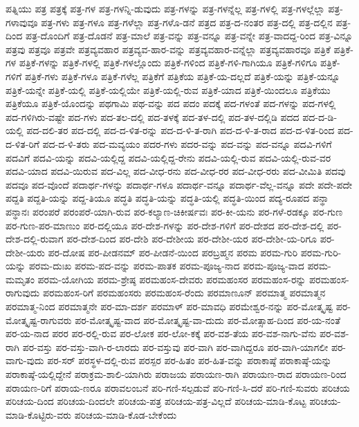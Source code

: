 {ಪತ್ನಿಯು
ಪತ್ರ
ಪತ್ರಕ್ಕೆ
ಪತ್ರ-ಗಳ
ಪತ್ರ-ಗಳನ್ನಿ-ಡುವುದು
ಪತ್ರ-ಗಳನ್ನು
ಪತ್ರ-ಗಳನ್ನೆಲ್ಲ
ಪತ್ರ-ಗಳಲ್ಲಿ
ಪತ್ರ-ಗಳಲ್ಲೆಲ್ಲಾ
ಪತ್ರ-ಗಳಾವುವೂ
ಪತ್ರ-ಗಳು
ಪತ್ರ-ಗಳೂ
ಪತ್ರ-ಗಳೆಲ್ಲಾ
ಪತ್ರ-ಗಳೊ-ಡನೆ
ಪತ್ರದ
ಪತ್ರ-ದ-ನಂತರ
ಪತ್ರ-ದಲ್ಲಿ
ಪತ್ರ-ದಲ್ಲಿನ
ಪತ್ರ-ದಿಂದ
ಪತ್ರ-ದೊಂದಿಗೆ
ಪತ್ರ-ದೊಡನೆ
ಪತ್ರ-ಮಾಲೆ
ಪತ್ರ-ವನ್ನು
ಪತ್ರ-ವನ್ನೂ
ಪತ್ರ-ವನ್ನೇ
ಪತ್ರ-ವಾದದ್ದ-ರಿಂದ
ಪತ್ರ-ವಿನ್ನೂ
ಪತ್ರವು
ಪತ್ರವೂ
ಪತ್ರವೇ
ಪತ್ರವ್ಯವಹಾರ
ಪತ್ರವ್ಯವ-ಹಾರ-ವನ್ನು
ಪತ್ರವ್ಯವಹಾರ-ವನ್ನೆಲ್ಲಾ
ಪತ್ರವ್ಯವಹಾರವೂ
ಪತ್ರಿಕೆ
ಪತ್ರಿಕೆ-ಗಳ
ಪತ್ರಿಕೆ-ಗಳನ್ನು
ಪತ್ರಿಕೆ-ಗಳಲ್ಲಿ
ಪತ್ರಿಕೆ-ಗಳಲ್ಲೊಂದು
ಪತ್ರಿಕೆ-ಗಳಿಂದ
ಪತ್ರಿಕೆ-ಗಳಿ-ಗಾಗಿಯೂ
ಪತ್ರಿಕೆ-ಗಳಿಗೂ
ಪತ್ರಿಕೆ-ಗಳಿಗೆ
ಪತ್ರಿಕೆ-ಗಳು
ಪತ್ರಿಕೆ-ಗಳೂ
ಪತ್ರಿಕೆ-ಗಳೆಲ್ಲ
ಪತ್ರಿಕೆಗೆ
ಪತ್ರಿಕೆಯ
ಪತ್ರಿಕೆ-ಯ-ದಲ್ಲದೆ
ಪತ್ರಿಕೆ-ಯನ್ನು
ಪತ್ರಿಕೆ-ಯನ್ನೂ
ಪತ್ರಿಕೆ-ಯನ್ನೇ
ಪತ್ರಿಕೆ-ಯಲ್ಲಿ
ಪತ್ರಿಕೆ-ಯಲ್ಲಿಯೇ
ಪತ್ರಿಕೆ-ಯಲ್ಲಿ-ರುವ
ಪತ್ರಿಕೆ-ಯಾದ
ಪತ್ರಿಕೆ-ಯಿಂದಲೂ
ಪತ್ರಿಕೆಯು
ಪತ್ರಿಕೆಯೂ
ಪತ್ರಿಕೆ-ಯೊಂದನ್ನು
ಪಥಗಾಮಿ
ಪಥ-ವನ್ನು
ಪದ
ಪದಂ
ಪದಕ್ಕೆ
ಪದ-ಗಳಂತೆ
ಪದ-ಗಳನ್ನು
ಪದ-ಗಳಲ್ಲಿ
ಪದ-ಗಳಿಗಿರು-ವಷ್ಟೇ
ಪದ-ಗಳು
ಪದ-ತಲ-ದಲ್ಲಿ
ಪದ-ತಳಕ್ಕೆ
ಪದ-ತಳ-ದಲ್ಲಿ
ಪದ-ತಳ-ದಲ್ಲಿಡಿ
ಪದದ
ಪದ-ದ-ಡಿ-ಯಲ್ಲಿ
ಪದ-ದಲಿ-ತರ
ಪದ-ದಲ್ಲಿ
ಪದ-ದ-ಳಿತ-ರನ್ನು
ಪದ-ದ-ಳಿ-ತ-ರಾಗಿ
ಪದ-ದ-ಳಿ-ತ-ರಾದ
ಪದ-ದ-ಳಿತ-ರಿಂದ
ಪದ-ದ-ಳಿತ-ರಿಗೆ
ಪದ-ದ-ಳಿ-ತರು
ಪದ-ಮವ್ಯಯಂ
ಪದರ-ಗಳು
ಪದರ-ವನ್ನು
ಪದ-ವನ್ನು
ಪದ-ವನ್ನೂ
ಪದವಿ-ಗಳಿಗೆ
ಪದವಿಗೆ
ಪದವಿ-ಯನ್ನು
ಪದವಿ-ಯಲ್ಲಿದ್ದ
ಪದವಿ-ಯಲ್ಲಿದ್ದ-ರೇನು
ಪದವಿ-ಯಲ್ಲಿ-ರುವ
ಪದವಿ-ಯಲ್ಲಿ-ರುವ-ವರ
ಪದವಿ-ಯಾದ
ಪದವಿ-ಯಿರುವ
ಪದ-ವಿಲ್ಲ
ಪದ-ವೀಧ-ರನು
ಪದ-ವೀಧ-ರರ
ಪದ-ವೀಧ-ರರು
ಪದ-ವೀಮಿತಿ
ಪದವು
ಪದವೂ
ಪದ-ವೊಂದೆ
ಪದಾರ್ಥ-ಗಳನ್ನು
ಪದಾರ್ಥ-ಗಳೂ
ಪದಾರ್ಥ-ವನ್ನೂ
ಪದಾರ್ಥ-ವೆಲ್ಲ-ವನ್ನೂ
ಪದೇ
ಪದೇ-ಪದೇ
ಪದ್ದತಿ
ಪದ್ದತಿ-ಯನ್ನು
ಪದ್ದ-ತಿಯೂ
ಪದ್ಧತಿ
ಪದ್ಧತಿ-ಯನ್ನು
ಪದ್ಧತಿ-ಯಲ್ಲಿ
ಪದ್ಧತಿ-ಯಿಂದ
ಪದ್ಯ-ರೂಪದ
ಪನ್ಥಾ
ಪನ್ಥಾನಃ
ಪರಂಪರೆ
ಪರಂಪರೆ-ಯಾಗಿ-ರುವ
ಪರ-ಕಲ್ಯಾಣ-ಚಿಕೀರ್ಷವಃ
ಪರ-ಕೀ-ಯನು
ಪರ-ಗಳೆ-ರಡಕ್ಕೂ
ಪರ-ಗುಣ
ಪರ-ಗುಣ-ಪರ-ಮಾಣುಂ
ಪರ-ದಲ್ಲಿಯೂ
ಪರ-ದೇಶ-ಗಳನ್ನು
ಪರ-ದೇಶ-ಗಳಿಗೆ
ಪರ-ದೇಶದ
ಪರ-ದೇಶ-ದಲ್ಲಿ
ಪರ-ದೇಶ-ದಲ್ಲಿ-ರುವಾಗ
ಪರ-ದೇಶ-ದಿಂದ
ಪರ-ದೇಶಿ
ಪರ-ದೇಶೀಯ
ಪರ-ದೇಶೀ-ಯರ
ಪರ-ದೇಶೀ-ಯ-ರಿಗೂ
ಪರ-ದೇಶೀ-ಯರು
ಪರ-ದೋಷ
ಪರ-ಪೀಡನಮ್
ಪರ-ಪೀಡನೆ-ಯಿಂದ
ಪರಬ್ರಹ್ಮನ
ಪರಮ
ಪರಮ-ಗುರಿ
ಪರಮ-ಗುರಿ-ಯನ್ನು
ಪರಮ-ದುಃಖ
ಪರಮ-ಪದ-ವನ್ನು
ಪರಮ-ಪಾತಕ
ಪರಮ-ಪೂಜ್ಯ-ನಾದ
ಪರಮ-ಪೂಜ್ಯ-ವಾದ
ಪರಮ-ಮಮೃತಂ
ಪರಮ-ಯೋಗಿಯ
ಪರಮ-ಶ್ರೇಷ್ಠ
ಪರಮಹಂಸ-ದೇವರು
ಪರಮಹಂಸರ
ಪರಮಹಂಸ-ರನ್ನು
ಪರಮಹಂಸ-ರಾಗುವುದು
ಪರಮಹಂಸ-ರಿಗೆ
ಪರಮಹಂಸರು
ಪರಮಹಂಸ-ರೆಂದು
ಪರಮಾಣೂನ್
ಪರಮಾತ್ಮ
ಪರಮಾತ್ಮನ
ಪರಮಾತ್ಮ-ನಿಂದ
ಪರಮಾತ್ಮನೇ
ಪರ-ಮಾ-ದರ್ಶ
ಪರಮಾಳ್
ಪರ-ಮಾವಧಿ
ಪರಮೇಶ್ವರ-ನನ್ನು
ಪರ-ಮೋತ್ಕೃಷ್ಟ
ಪರ-ಮೋತ್ಕೃಷ್ಟ-ರಾಗುವರು
ಪರ-ಮೋತ್ಕೃಷ್ಟ-ವಾದ
ಪರ-ಮೋತ್ಕೃಷ್ಟ-ವಾ-ದುದು
ಪರ-ಮೋತ್ಸಾಹ-ದಿಂದ
ಪರ-ಯ-ನಂತೆ
ಪರ-ಯ-ನಾದ
ಪರರ
ಪರ-ರಲ್ಲಿ-ರುವ
ಪರ-ಲೋಕ
ಪರ-ಲೋ-ಕಕ್ಕೆ
ಪರ-ವಶ-ತೆಯ
ಪರ-ವಶ-ನಾಗು-ವೆನು
ಪರ-ವಶ-ರಾಗಿ
ಪರ-ವಸ್ತು
ಪರ-ವಸ್ತು-ವಾಗಿ-ರ-ಲಾರದು
ಪರ-ವಸ್ತುವು
ಪರ-ವಾಗಿ
ಪರ-ವಾಗಿದ್ದರೂ
ಪರ-ವಾಗಿ-ಯಾಗಲೀ
ಪರ-ವಾಗು-ವುದು
ಪರ-ಸರ್
ಪರಸ್ಥಳ-ದಲ್ಲಿ-ರುವ
ಪರಸ್ಪರ
ಪರ-ಹಿತಂ
ಪರ-ಹಿತ-ವನ್ನು
ಪರಾಕಾಷ್ಠೆ
ಪರಾಕಾಷ್ಠೆ-ಯನ್ನು
ಪರಾಕಾಷ್ಠೆ-ಯಲ್ಲಿದ್ದೇನೆ
ಪರಾಕ್ರಮ-ಶಾಲಿ-ಯಾಗಿರು
ಪರಾಜಯ
ಪರಾಯಣ-ರಾಗಿ
ಪರಾಯಣ-ರಾದ
ಪರಾಯಣ-ರಿಂದ
ಪರಾಯಣ-ರಿಗೆ
ಪರಾಯ-ಣರೂ
ಪರಾವಲಂಬನೆ
ಪರಿ-ಗಣಿ-ಸಲ್ಪಡುವೆ
ಪರಿ-ಗಣಿ-ಸಿ-ದರೆ
ಪರಿ-ಗಣಿ-ಸುವರು
ಪರಿಚಯ
ಪರಿಚಯ-ದಿಂದ
ಪರಿಚಯ-ದಿಂದಲೇ
ಪರಿಚಯ-ಪತ್ರ
ಪರಿಚಯ-ಪತ್ರ-ವಿಲ್ಲದೆ
ಪರಿಚಯ-ಮಾಡಿ-ಕೊಟ್ಟ
ಪರಿಚಯ-ಮಾಡಿ-ಕೊಟ್ಟಿರು-ವರು
ಪರಿಚಯ-ಮಾಡಿ-ಕೊಡ-ಬೇಕೆಂದು
}
